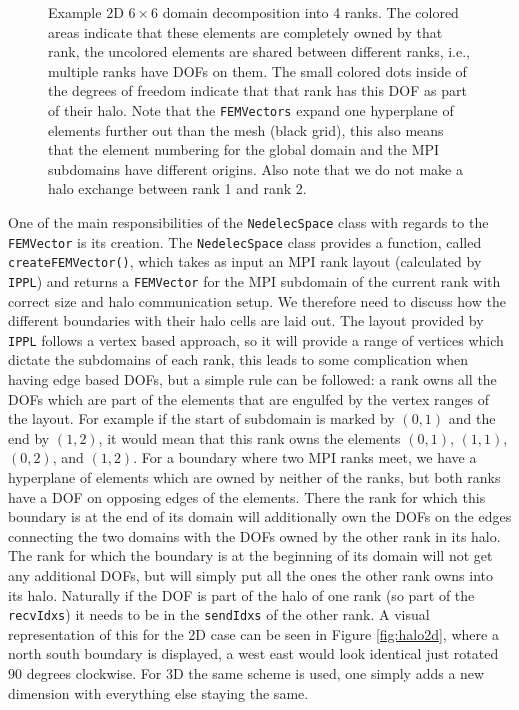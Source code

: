 \begin{figure}
    \centering
    
    \caption{Example 2D \(6 \times 6\) domain decomposition into 4 ranks. The colored areas indicate that these elements are completely owned by that rank, the uncolored elements are shared between different ranks, i.e., multiple ranks have DOFs on them. The small colored dots inside of the degrees of freedom indicate that that rank has this DOF as part of their halo. Note that the \texttt{FEMVectors} expand one hyperplane of elements further out than the mesh (black grid), this also means that the element numbering for the global domain and the MPI subdomains have different origins. Also note that we do not make a halo exchange between rank 1 and rank 2.}
    \label{fig:domain_decomp2d}
\end{figure}

One of the main responsibilities of the \texttt{NedelecSpace} class with regards to the \texttt{FEMVector} is its creation. The \texttt{NedelecSpace} class provides a function, called \texttt{createFEMVector()}, which takes as input an MPI rank layout (calculated by \texttt{IPPL}) and returns a \texttt{FEMVector} for the MPI subdomain of the current rank with correct size and halo communication setup. We therefore need to discuss how the different boundaries with their halo cells are laid out. The layout provided by \texttt{IPPL} follows a vertex based approach, so it will provide a range of vertices which dictate the subdomains of each rank, this leads to some complication when having edge based DOFs, but a simple rule can be followed: a rank owns all the DOFs which are part of the elements that are engulfed by the vertex ranges of the layout. For example if the start of subdomain is marked by \((0,1)\) and the end by \((1,2)\), it would mean that this rank owns the elements \((0,1)\), \((1,1)\), \((0,2)\), and \((1,2)\). For a boundary where two MPI ranks meet, we have a hyperplane of elements which are owned by neither of the ranks, but both ranks have a DOF on opposing edges of the elements. There the rank for which this boundary is at the end of its domain will additionally own the DOFs on the edges connecting the two domains with the DOFs owned by the other rank in its halo. The rank for which the boundary is at the beginning of its domain will not get any additional DOFs, but will simply put all the ones the other rank owns into its halo. Naturally if the DOF is part of the halo of one rank (so part of the \texttt{recvIdxs}) it needs to be in the \texttt{sendIdxs} of the other rank. A visual representation of this for the 2D case can be seen in Figure \ref{fig:halo2d}, where a north south boundary is displayed, a west east would look identical just rotated \(90\) degrees clockwise. For 3D the same scheme is used, one simply adds a new dimension with everything else staying the same.\medskip

